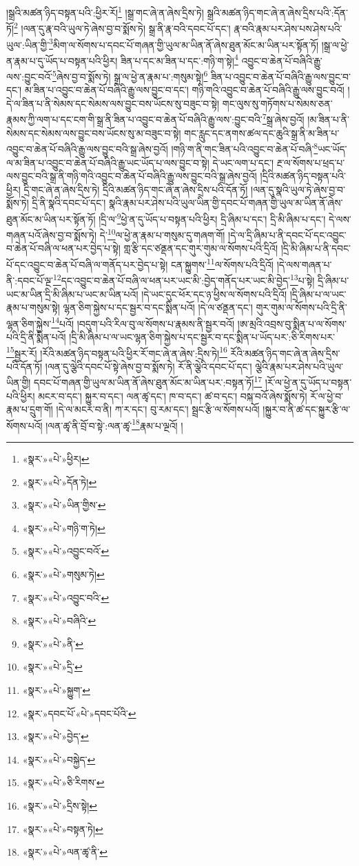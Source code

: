 །སྒྲའི་མཚན་ཉིད་བསྟན་པའི་:ཕྱིར་རོ།\footnote{«སྣར་»«པེ་»ཕྱིར།} །སྒྲ་གང་ཞེ་ན་ཞེས་དྲིས་ཏེ། སྒྲའི་མཚན་ཉིད་གང་ཞེ་ན་ཞེས་དྲིས་པའི་:དོན་ཏོ།\footnote{«སྣར་»«པེ་»དོན་ཏེ།} །ལན་དུ་རྣ་བའི་ཡུལ་ཏེ་ཞེས་བྱ་བ་སྨོས་ཏེ། སྒྲ་ནི་རྣ་བའི་དབང་པོ་དང་། རྣ་བའི་རྣམ་པར་ཤེས་པས་ཤེས་པའི་ཡུལ་:ཡིན་གྱི་\footnote{«སྣར་»«པེ་»ཡིན་གྱིས་}མིག་ལ་སོགས་པ་དབང་པོ་གཞན་གྱི་ཡུལ་མ་ཡིན་ནོ་ཞེས་ཐུན་མོང་མ་ཡིན་པར་སྟོན་ཏོ། །སྒྲ་ལ་ཕྱེ་ན་རྣམ་པ་དུ་ཡོད་པ་བསྟན་པའི་ཕྱིར། ཟིན་པ་དང་མ་ཟིན་པ་དང་:གཉི་ག་སྟེ།\footnote{«སྣར་»«པེ་»གཉི་ག་ཏེ།} འབྱུང་བ་ཆེན་པོ་བཞིའི་རྒྱུ་ལས་:བྱུང་བའོ་\footnote{«སྣར་»«པེ་»འབྱུང་བའོ་}ཞེས་བྱ་བ་སྨོས་ཏེ། སྒྲ་ལ་ཕྱེ་ན་རྣམ་པ་:གསུམ་སྟེ།\footnote{«སྣར་»«པེ་»གསུམ་ཏེ།} ཟིན་པ་འབྱུང་བ་ཆེན་པོ་བཞིའི་རྒྱུ་ལས་བྱུང་བ་དང་། མ་ཟིན་པ་འབྱུང་བ་ཆེན་པོ་བཞིའི་རྒྱུ་ལས་བྱུང་བ་དང་། གཉི་གའི་འབྱུང་བ་ཆེན་པོ་བཞིའི་རྒྱུ་ལས་བྱུང་བའོ། །དེ་ལ་ཟིན་པ་ནི་སེམས་དང་སེམས་ལས་བྱུང་བས་ཡོངས་སུ་བཟུང་བ་སྟེ། གང་ལུས་སུ་གཏོགས་པ་སེམས་ཅན་རྣམས་ཀྱི་ལག་པ་དང་ངག་གི་སྒྲ་ནི་ཟིན་པ་འབྱུང་བ་ཆེན་པོ་བཞིའི་རྒྱུ་ལས་:བྱུང་བའི་\footnote{«སྣར་»«པེ་»འབྱུང་བའི་}སྒྲ་ཞེས་བྱའོ། །མ་ཟིན་པ་ནི་སེམས་དང་སེམས་ལས་བྱུང་བས་ཡོངས་སུ་མ་བཟུང་བ་སྟེ། གང་རླུང་དང་ནགས་ཚལ་དང་ཆུའི་སྒྲ་ནི་མ་ཟིན་པ་འབྱུང་བ་ཆེན་པོ་བཞིའི་རྒྱུ་ལས་བྱུང་བའི་སྒྲ་ཞེས་བྱའོ། །གཉི་ག་ནི་གང་ཟིན་པའི་འབྱུང་བ་ཆེན་པོ་བཞི་\footnote{«སྣར་»«པེ་»བཞིའི་}ཡང་ཡོད་ལ་མ་ཟིན་པ་འབྱུང་བ་ཆེན་པོ་བཞིའི་རྒྱུ་ཡང་ཡོད་པ་ལས་བྱུང་བ་སྟེ། དེ་ཡང་ལག་པ་དང་། རྔ་ལ་སོགས་པ་ཕྲད་པ་ལས་བྱུང་བའི་སྒྲ་ནི་གཉི་གའི་འབྱུང་བ་ཆེན་པོ་བཞིའི་རྒྱུ་ལས་བྱུང་བའི་སྒྲ་ཞེས་བྱའོ། །དྲིའི་མཚན་ཉིད་བསྟན་པའི་ཕྱིར། དྲི་གང་ཞེ་ན་ཞེས་དྲིས་ཏེ། དྲིའི་མཚན་ཉིད་གང་ཞེ་ན་ཞེས་དྲིས་པའི་དོན་ཏོ། །ལན་དུ་སྣའི་ཡུལ་ཏེ་ཞེས་བྱ་བ་སྨོས་ཏེ། དྲི་ནི་སྣའི་དབང་པོ་དང་། སྣའི་རྣམ་པར་ཤེས་པའི་ཡུལ་ཡིན་གྱི་དབང་པོ་གཞན་གྱི་ཡུལ་མ་ཡིན་ནོ་ཞེས་ཐུན་མོང་མ་ཡིན་པར་སྟོན་ཏོ། །དྲི་ལ་\footnote{«སྣར་»«པེ་»ནི་}ཕྱེ་ན་དུ་ཡོད་པ་བསྟན་པའི་ཕྱིར། དྲི་ཞིམ་པ་དང་། དྲི་མི་ཞིམ་པ་དང་། དེ་ལས་གཞན་པའོ་ཞེས་བྱ་བ་སྨོས་ཏེ། དེ་\footnote{«སྣར་»«པེ་»དྲི་}ལ་ཕྱེ་ན་རྣམ་པ་གསུམ་དུ་གཞག་གོ། །དེ་ལ་དྲི་ཞིམ་པ་ནི་དབང་པོ་དང་འབྱུང་བ་ཆེན་པོ་བཞི་ལ་ཕན་པར་བྱེད་པ་སྟེ། གླ་རྩི་དང་ཙནྡན་དང་གུར་གུམ་ལ་སོགས་པའི་དྲིའོ། །དྲི་མི་ཞིམ་པ་ནི་དབང་པོ་དང་འབྱུང་བ་ཆེན་པོ་བཞི་ལ་གནོད་པར་བྱེད་པ་སྟེ། ངན་སྐྱུགས་\footnote{«སྣར་»«པེ་»སྐྱུག་}ལ་སོགས་པའི་དྲིའོ། །དེ་ལས་གཞན་པ་ནི་:དབང་པོ་ལྔ་\footnote{«སྣར་»དབང་པོ་«པེ་»དབང་པོའི་}དང་འབྱུང་བ་ཆེན་པོ་བཞི་ལ་ཕན་པར་ཡང་མི་:བྱེད་གནོད་པར་ཡང་མི་བྱེད་\footnote{«སྣར་»«པེ་»བྱེད་}པ་སྟེ། དྲི་ཞིམ་པ་ཡང་མ་ཡིན་དྲི་མི་ཞིམ་པ་ཡང་མ་ཡིན་པའོ། །དེ་ཡང་དུང་ཕོར་དང་ཉ་ཕྱིས་ལ་སོགས་པའི་དྲིའོ། །དྲི་ཞིམ་པ་ལ་ཡང་རྣམ་པ་གསུམ་སྟེ། ལྷན་ཅིག་སྐྱེས་པ་དང་སྦྱར་བ་དང་སྨིན་པའོ། །དེ་ལ་ཙནྡན་དང་། གུར་གུམ་ལ་སོགས་པའི་དྲི་ནི་ལྷན་ཅིག་སྐྱེས་\footnote{«སྣར་»«པེ་»བསྐྱེད་}པའོ། །བདུག་པའི་རིལ་བུ་ལ་སོགས་པ་རྣམས་ནི་སྦྱར་བའོ། །ཨ་མྲའི་འབྲས་བུ་སྨིན་པ་ལ་སོགས་པའི་དྲི་ནི་སྨིན་པའོ། །དྲི་མི་ཞིམ་པ་ལ་ཡང་ལྷན་ཅིག་སྐྱེས་པ་དང་སྦྱར་བ་དང་སྨིན་པ་ཡོད་པར་:ཅི་རིགས་པར་\footnote{«སྣར་»«པེ་»ཅི་རིགས་}སྦྱར་རོ། །རོའི་མཚན་ཉིད་བསྟན་པའི་ཕྱིར་རོ་གང་ཞེ་ན་ཞེས་:དྲིས་ཏེ།\footnote{«སྣར་»«པེ་»དྲིས་སྟེ།} རོའི་མཚན་ཉིད་གང་ཞེ་ན་ཞེས་དྲིས་པའི་དོན་ཏོ། །ལན་དུ་ལྕེའི་དབང་པོ་སྟེ་ཞེས་བྱ་བ་སྨོས་ཏེ། རོ་ནི་ལྕེའི་དབང་པོ་དང་། ལྕེའི་རྣམ་པར་ཤེས་པའི་ཡུལ་ཡིན་གྱི། དབང་པོ་གཞན་གྱི་ཡུལ་མ་ཡིན་ནོ་ཞེས་ཐུན་མོང་མ་ཡིན་པར་:བསྟན་ཏོ།\footnote{«སྣར་»«པེ་»བསྟན་ཏེ།} །རོ་ལ་ཕྱེ་ན་དུ་ཡོད་པ་བསྟན་པའི་ཕྱིར། མངར་བ་དང་། སྐྱུར་བ་དང་། ལན་ཚྭ་དང་། ཁ་བ་དང་། ཚ་བ་དང་། བསྐ་བའོ་ཞེས་སྨོས་ཏེ། རོ་ལ་ཕྱེ་བ་རྣམ་པ་དྲུག་གོ། །དེ་ལ་མངར་བ་ནི། ཀ་ར་དང་། བུ་རམ་དང་། སྦྲང་རྩི་ལ་སོགས་པའོ། །སྐྱུར་བ་ནི་ཚ་དང་སྐྱུར་རྩི་ལ་སོགས་པའོ། །ལན་ཚྭ་ནི་བྲོ་བ་སྟེ་:ལན་ཚྭ་\footnote{«སྣར་»«པེ་»ལན་ཚྭ་ནི་}རྣམ་པ་ལྔའོ། །
